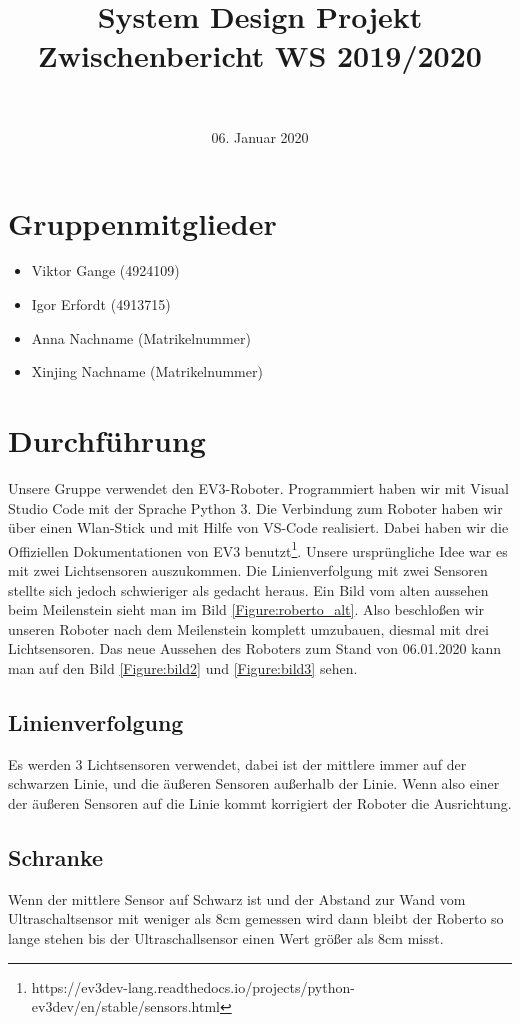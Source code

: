 \documentclass[11pt]{article}
\title{
  \vspace{2cm}
  \Huge System Design Projekt \\
  \LARGE Zwischenbericht WS 2019/2020
}
\author{ \Large \red{Roberto (\#112)}\\ }
\date{ 06. Januar 2020 }
\begin{document}
\maketitle  %

\section{Gruppenmitglieder}
\begin{itemize}
  \item Viktor Gange (4924109)
  \item Igor Erfordt (4913715)
  \item Anna Nachname (Matrikelnummer)
  \item Xinjing Nachname (Matrikelnummer)
\end{itemize}

\section{Durchführung}
Unsere Gruppe verwendet den EV3-Roboter. Programmiert haben wir mit Visual Studio Code mit der Sprache Python 3. Die Verbindung zum Roboter haben wir über einen Wlan-Stick und mit Hilfe von VS-Code realisiert. Dabei haben wir die Offiziellen Dokumentationen von EV3 benutzt\footnote{https://ev3dev-lang.readthedocs.io/projects/python-ev3dev/en/stable/sensors.html}. Unsere ursprüngliche Idee war es mit zwei Lichtsensoren auszukommen. Die Linienverfolgung mit zwei Sensoren stellte sich jedoch schwieriger als gedacht heraus. Ein Bild vom alten aussehen beim Meilenstein sieht man im Bild \ref{Figure:roberto_alt}. Also beschloßen wir unseren Roboter nach dem Meilenstein komplett umzubauen, diesmal mit drei Lichtsensoren. Das neue Aussehen des Roboters zum Stand von 06.01.2020 kann man auf den Bild \ref{Figure:bild2} und \ref{Figure:bild3} sehen.

\subsection{Linienverfolgung}
Es werden 3 Lichtsensoren verwendet, dabei ist der mittlere immer auf der schwarzen Linie, und die äußeren Sensoren außerhalb der Linie. Wenn also einer der äußeren Sensoren auf die Linie kommt korrigiert der Roboter die Ausrichtung.

\subsection{Schranke}
Wenn der mittlere Sensor auf Schwarz ist und der Abstand zur Wand vom Ultraschaltsensor mit weniger als 8cm gemessen wird dann bleibt der Roberto so lange stehen bis der Ultraschallsensor einen Wert größer als 8cm misst.
\end{document}
